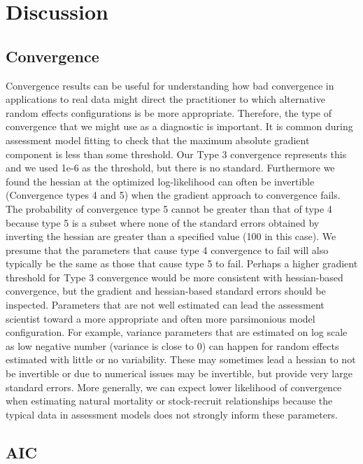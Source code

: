 \documentclass[
  12pt,
]{article}
\begin{document}
\hypertarget{discussion}{%
\section*{Discussion}\label{discussion}}

\hypertarget{convergence}{%
\subsection*{Convergence}\label{convergence}}

Convergence results can be useful for understanding how bad convergence
in applications to real data might direct the practitioner to which
alternative random effects configurations is be more appropriate.
Therefore, the type of convergence that we might use as a diagnostic is
important. It is common during assessment model fitting to check that
the maximum absolute gradient component is less than some threshold. Our
Type 3 convergence represents this and we used 1e-6 as the threshold,
but there is no standard. Furthermore we found the hessian at the
optimized log-likelihood can often be invertible (Convergence types 4
and 5) when the gradient approach to convergence fails. The probability
of convergence type 5 cannot be greater than that of type 4 because type
5 is a subset where none of the standard errors obtained by inverting
the hessian are greater than a specified value (100 in this case). We
presume that the parameters that cause type 4 convergence to fail will
also typically be the same as those that cause type 5 to fail. Perhaps a
higher gradient threshold for Type 3 convergence would be more
consistent with hessian-based convergence, but the gradient and
hessian-based standard errors should be inspected. Parameters that are
not well estimated can lead the assessment scientist toward a more
appropriate and often more parsimonious model configuration. For
example, variance parameters that are estimated on log scale as low
negative number (variance is close to 0) can happen for random effects
estimated with little or no variability. These may sometimes lead a
hessian to not be invertible or due to numerical issues may be
invertible, but provide very large standard errors. More generally, we
can expect lower likelihood of convergence when estimating natural
mortality or stock-recruit relationships because the typical data in
assessment models does not strongly inform these parameters.

\hypertarget{aic}{%
\subsection*{AIC}\label{aic}}
\end{document}

